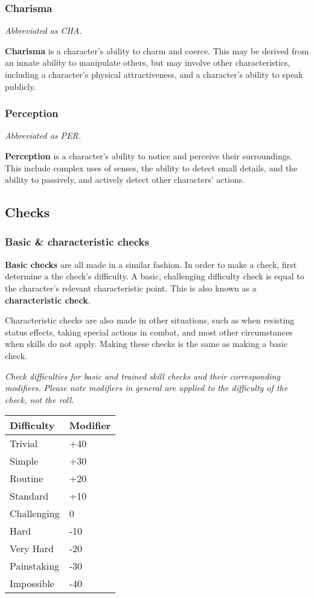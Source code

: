 \documentclass[12pt,]{article}
\begin{document}
\subsubsection{Charisma}\label{charisma}

\emph{Abbreviated as CHA.}

\textbf{Charisma} is a character's ability to charm and coerce. This may
be derived from an innate ability to manipulate others, but may involve
other characteristics, including a character's physical attractiveness,
and a character's ability to speak publicly.

\subsubsection{Perception}\label{perception}

\emph{Abbreviated as PER.}

\textbf{Perception} is a character's ability to notice and perceive
their surroundings. This include complex uses of senses, the ability to
detect small details, and the ability to passively, and actively detect
other characters' actions.

\subsection{Checks}\label{checks}

\subsubsection{Basic \& characteristic
checks}\label{basic-characteristic-checks}

\textbf{Basic checks} are all made in a similar fashion. In order to
make a check, first determine a the check's difficulty. A basic,
challenging difficulty check is equal to the character's relevant
characteristic point. This is also known as a \textbf{characteristic
check}.

Characteristic checks are also made in other situations, such as when
resisting status effects, taking special actions in combat, and most
other circumstances when skills do not apply. Making these checks is the
same as making a basic check.

\emph{Check difficulties for basic and trained skill checks and their
corresponding modifiers. Please note modifiers in general are applied to
the difficulty of the check, not the roll.}

\begin{longtable}[]{@{}ll@{}}
\toprule
Difficulty & Modifier\tabularnewline
\midrule
\endhead
Trivial & +40\tabularnewline
Simple & +30\tabularnewline
Routine & +20\tabularnewline
Standard & +10\tabularnewline
Challenging & 0\tabularnewline
Hard & -10\tabularnewline
Very Hard & -20\tabularnewline
Painstaking & -30\tabularnewline
Impossible & -40\tabularnewline
\bottomrule
\end{longtable}
\end{document}
